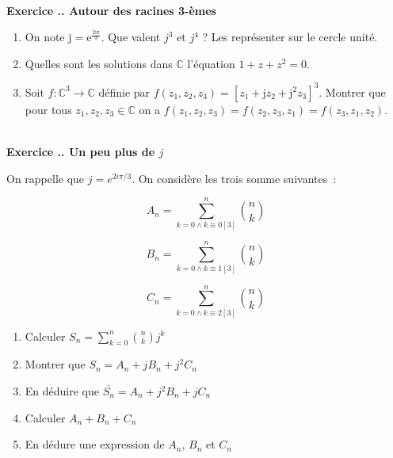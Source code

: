 \documentclass{article}
\newcommand{\mb}[1]{\mathbb{#1}}
\newcounter{exo}
\newcommand{\exercice}[1][\null]{\textbf{\\ Exercice \thesection.\theexo. #1} \addtocounter{exo}{1}}
\begin{document}
\exercice[Autour des racines 3-èmes]

\begin{enumerate}

\item On note $\text{j} = \text{e}^{\frac{2 \text{i} \pi}{3}}$. Que valent $j^3$ et $j^4$ ? Les représenter sur le cercle unité.

\item Quelles sont les solutions dans $\mb{C}$ l'équation $1 + z + z^2 = 0$.

\item Soit $f : \mb{C}^3 \rightarrow \mb{C}$ définie par $f(z_1, z_2, z_3) = \left[z_1 + \text{j} z_2 + \text{j}^2 z_3\right]^3$. Montrer que pour tous $z_1, z_2, z_3 \in \mb{C}$ on a $f(z_1, z_2, z_3) = f(z_2, z_3, z_1) = f(z_3, z_1, z_2)$.

\end{enumerate}

\exercice[Un peu plus de $j$]

On rappelle que $j = e^{2i\pi /3}$.
On considère les trois somme suivantes~:

\begin{equation*}
    A_n = \sum_{k = 0 \wedge k \equiv 0 [3]}^{n} { n \choose k} 
\end{equation*}

\begin{equation*}
    B_n = \sum_{k = 0 \wedge k \equiv 1 [3]}^{n} { n \choose k} 
\end{equation*}

\begin{equation*}
    C_n = \sum_{k = 0 \wedge k \equiv 2 [3]}^{n} { n \choose k} 
\end{equation*}

\begin{enumerate}
    \item Calculer $S_n = \sum_{k = 0}^n { n \choose k } j^k$
    \item Montrer que $S_n = A_n + j B_n + j^2 C_n$
    \item En déduire que $\overline{S_n} = A_n + j^2 B_n + jC_n$
    \item Calculer $A_n + B_n + C_n$
    \item En dédure une expression de $A_n$, $B_n$ et $C_n$
\end{enumerate}
\end{document}
